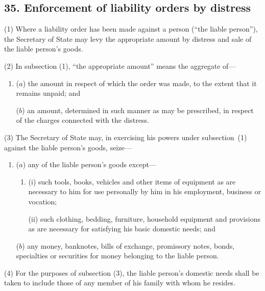 \documentclass[12pt,a4paper]{article}
\begin{document}


\subsection{35. Enforcement of liability orders by distress}

(1) Where a liability order has been made against a person (“the liable person”), the Secretary of State may levy the appropriate amount by distress and sale of the liable person’s goods.

(2) In subsection (1), “the appropriate amount” means the aggregate of—
\begin{enumerate}\item[]
($a$) the amount in respect of which the order was made, to the extent that it remains unpaid; and

($b$) an amount, determined in such manner as may be prescribed, in respect of the charges connected with the distress.
\end{enumerate}

(3) The Secretary of State may, in exercising his powers under subsection~(1)  against the liable person’s goods, seize—
\begin{enumerate}\item[]
($a$) any of the liable person’s goods except—
\begin{enumerate}\item[]
(i) such tools, books, vehicles and other items of equipment as are necessary to him for use personally by him in his employment, business or vocation;

(ii) such clothing, bedding, furniture, household equipment and provisions as are necessary for satisfying his basic domestic needs; and
\end{enumerate}

($b$) any money, banknotes, bills of exchange, promissory notes, bonds, specialties or securities for money belonging to the liable person.
\end{enumerate}

(4) For the purposes of subsection (3), the liable person’s domestic needs shall be taken to include those of any member of his family with whom he resides.
\end{document}
